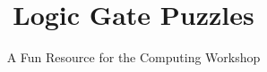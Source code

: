 \documentclass[12pt]{article}
\begin{document}
\title{Logic Gate Puzzles}
\author{A Fun Resource for the Computing Workshop}
\date{}
\maketitle


\newpage



\clearpage
\newpage



\clearpage
\newpage



\clearpage
\newpage


\end{document}
